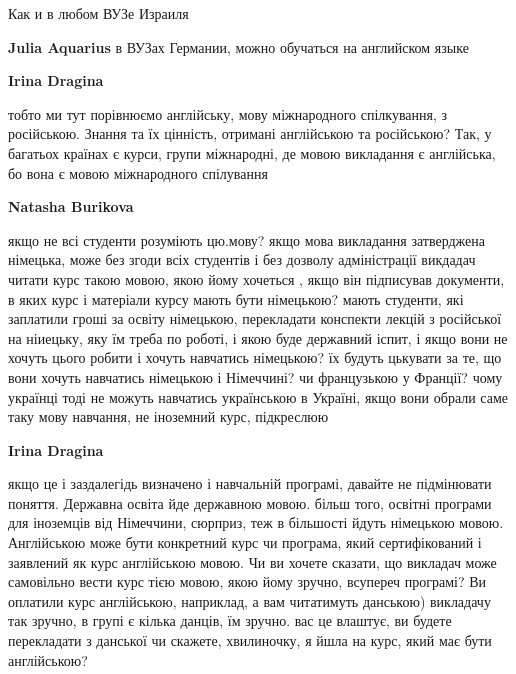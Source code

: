 \begin{itemize}
\begin{itemize}
Как и в любом ВУЗе Израиля


 
\textbf{Julia Aquarius} в ВУЗах Германии, можно обучаться на английском языке

 
\textbf{Irina Dragina} 

тобто ми тут порівнюємо англійську, мову міжнародного спілкування, з
російською. Знання та їх цінність, отримані англійською та російською? Так, у
багатьох країнах є курси, групи міжнародні, де мовою викладання є англійська,
бо вона є мовою міжнародного спілування


 
\textbf{Natasha Burikova} 

якщо не всі студенти розуміють цю.мову? якщо мова викладання затверджена
німецька, може без згоди всіх студентів і без дозволу адміністрації викдадач
читати курс такою мовою, якою йому хочеться , якщо він підписував документи, в
яких курс і матеріали курсу мають бути німецькою? мають студенти, які заплатили
гроші за освіту німецькою, перекладати конспекти лекцій з російської на
ніиецьку, яку їм треба по роботі, і якою буде державний іспит, і якщо вони не
хочуть цього робити і хочуть навчатись німецькою? їх будуть цькувати за те, що
вони хочуть навчатись німецькою і Німеччині? чи французькою у Франції? чому
українці тоді не можуть навчатись українською в Україні, якщо вони обрали саме
таку мову навчання, не іноземний курс, підкреслюю

 
\textbf{Irina Dragina} 

якщо це і заздалегідь визначено і навчальній програмі, давайте не підмінювати
поняття. Державна освіта йде державною мовою. більш того, освітні програми для
іноземців від Німеччини, сюрприз, теж в більшості йдуть німецькою мовою.
Англійською може бути конкретний курс чи програма, який сертифікований і
заявлений як курс англійською мовою. Чи ви хочете сказати, що викладач може
самовільно вести курс тією мовою, якою йому зручно, всупереч програмі? Ви
оплатили курс англійською, наприклад, а вам читатимуть данською) викладачу так
зручно, в групі є кілька данців, їм зручно. вас це влаштує, ви будете
перекладати з данської чи скажете, хвилиночку, я йшла на курс, який має бути
англійською?



\end{itemize}
\end{itemize}
